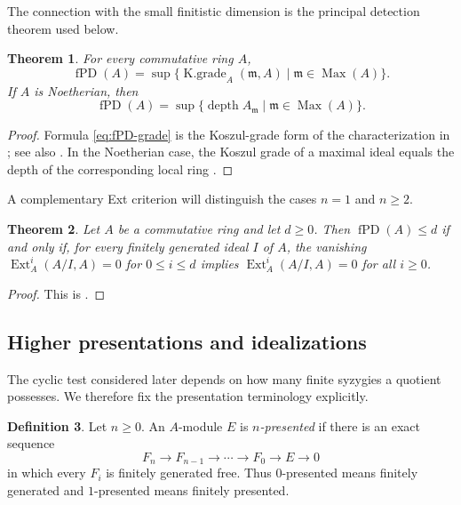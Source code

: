 \documentclass[11pt]{amsart}
\numberwithin{equation}{section}
\newtheorem{theorem}{Theorem}[section]
\theoremstyle{definition}
\newtheorem{definition}[theorem]{Definition}
\theoremstyle{remark}
\newcommand{\fPD}{\operatorname{fPD}}
\newcommand{\Ext}{\operatorname{Ext}}
\newcommand{\Max}{\operatorname{Max}}
\newcommand{\depth}{\operatorname{depth}}
\newcommand{\Kgr}{\operatorname{K.grade}}
\begin{document}
The connection with the small finitistic dimension is the principal detection theorem used below.

\begin{theorem}\label{thm:fPD-grade}
For every commutative ring $A$,
\begin{equation}\label{eq:fPD-grade}
 \fPD(A)=\sup\{\Kgr_A(\mathfrak m,A)\mid \mathfrak m\in\Max(A)\}.
\end{equation}
If $A$ is Noetherian, then
\begin{equation}\label{eq:fPD-depth}
 \fPD(A)=\sup\{\depth A_{\mathfrak m}\mid \mathfrak m\in\Max(A)\}.
\end{equation}
\end{theorem}

\begin{proof}
Formula \eqref{eq:fPD-grade} is the Koszul-grade form of the characterization in \cite[Theorem~3.1]{ZhangWang}; see also \cite[Theorem~3.4]{ZhangII}.  In the Noetherian case, the Koszul grade of a maximal ideal equals the depth of the corresponding local ring \cite[Section~1.2]{BrunsHerzog}.
\end{proof}

A complementary Ext criterion will distinguish the cases $n=1$ and $n\geq2$.

\begin{theorem}\label{thm:Ext-detection}
Let $A$ be a commutative ring and let $d\geq0$.  Then $\fPD(A)\leq d$ if and only if, for every finitely generated ideal $I$ of $A$, the vanishing $\Ext_A^i(A/I,A)=0$ for $0\leq i\leq d$ implies $\Ext_A^i(A/I,A)=0$ for all $i\geq0$.
\end{theorem}

\begin{proof}
This is \cite[Theorem~2.5]{ZhangIII}.
\end{proof}

\subsection{Higher presentations and idealizations}

The cyclic test considered later depends on how many finite syzygies a quotient possesses.  We therefore fix the presentation terminology explicitly.

\begin{definition}\label{def:n-presented}
Let $n\geq0$.  An $A$-module $E$ is \emph{$n$-presented} if there is an exact sequence
\[
 F_n\longrightarrow F_{n-1}\longrightarrow\cdots\longrightarrow F_0
 \longrightarrow E\longrightarrow0
\]
in which every $F_i$ is finitely generated free.  Thus $0$-presented means finitely generated and $1$-presented means finitely presented.
\end{definition}
\end{document}
